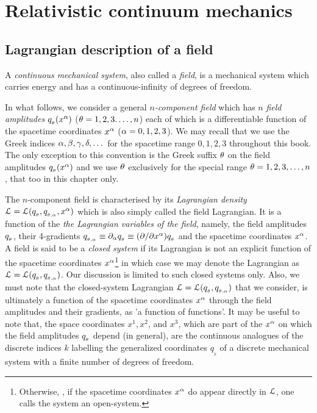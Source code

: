 \chapter{Relativistic continuum mechanics}




\section{Lagrangian description of a field}
A \textsl{continuous mechanical system}, also called a 
\textsl{field}, is a mechanical system which carries energy 
and has a  continuous-infinity of degrees of freedom.

In what follows, we consider a general 
\textsl{$n$-component field} which has  $n$ \textsl{field 
amplitudes} $q_{_{{\theta}}}  (x^{{\alpha}}) $ (${\theta} = 1,2,3.\dots,n $) each 
of which is a differentiable function of the spacetime 
coordinates $x^{{\alpha}}$ (${\alpha}=0,1,2,3 $). We may recall that 
we use the Greek  indices ${\alpha},{\beta},{\gamma},{\delta},\dots$ for 
the spacetime range $0,1,2,3$  throughout this book. The 
only exception to this  convention is the Greek suffix 
${\theta}$ on the field amplitudes $q_{_{{\theta}}}  (x^{{\alpha}}) $ and we use 
${\theta}$ exclusively for the special range  ${\theta} = 
1,2,3,\dots,n $, that too in this chapter only.

The $n$-component field is characterised by its   
\textsl{Lagrangian density} $\EuScript{L} = \EuScript{L} 
(q_{_{{\theta}}}  , q_{_{{\theta},{{\alpha}}}}, x^{{\alpha}})$ which is also simply called the 
field Lagrangian. It is a function of the  \textsl{the 
Lagrangian variables of the field},  namely, the field amplitudes $q_{_{{\theta}}} $, their 
4-gradients   $q_{_{{\theta},{{\alpha}}}}\equiv 
{\ensuremath{\partial}}_{{\alpha}}q_{_{{\theta}}}  \equiv ({\partial}/{\partial} x^{{\alpha}}) q_{_{{\theta}}}  $ and the  
spacetime coordinates $x^{{\alpha}}$. A field is said to be a 
\textsl{closed system}  if its 
Lagrangian is not an explicit function of the 
spacetime coordinates $x^{{\alpha}}$\footnote{Otherwise, \ie, if 
the spacetime coordinates 
$x^{{\alpha}}$ do appear directly in $\EuScript{L}$, one calls the 
system an open-system.} in which case we 
may denote the Lagrangian as  
$\EuScript{L}=\EuScript{L}(q_{_{{\theta}}} , q_{_{{\theta},{{\alpha}}}})$. Our   
discussion is limited to such closed 
systems only. Also, we must note that the closed-system 
Lagrangian  $\EuScript{L} = \EuScript{L} (q_{_{{\theta}}}  , 
q_{_{{\theta},{{\alpha}}}})$ that we consider, is ultimately a function of 
the spacetime coordinates $x^{{\alpha}}$ through the field  
amplitudes and their gradients, as 'a function of  
functions'.  It may be useful to note that, the space  
coordinates $x^1,x^2$, and $x^3$, which are part of the 
$x^{{\alpha}}$ on which the field amplitudes $q_{_{{\theta}}} $ depend (in 
general), are the continuous analogues of the discrete 
indices $k$ labelling the  generalized coordinates 
$q_{_k}$ of a discrete mechanical  system with a finite 
number of degrees of freedom.

